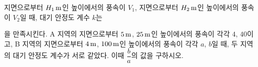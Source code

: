 지면으로부터 $H_1\mkern3mu \mathrm{m}$인 높이에서의 풍속이 $V_1$, 지면으로부터 $H_2\mkern3mu \mathrm{m}$인 높이에서의 풍속이 $V_2$일 때, 대기 안정도 계수 $k$는 \par\smallskip{}\par\smallskip\noindent 을 만족시킨다. A 지역의 지면으로부터 $5\mkern3mu \mathrm{m}$, $25\mkern3mu \mathrm{m}$인 높이에서의 풍속이 각각 $4$, $40$이고, B 지역의 지면으로부터 $4\mkern3mu \mathrm{m}$, $100\mkern3mu \mathrm{m}$인 높이에서의 풍속이 각각 $a$, $b$일 때, 두 지역의 대기 안정도 계수가 서로 같았다. 이때 $\dfrac{b}{a}$의 값을 구하시오. 
